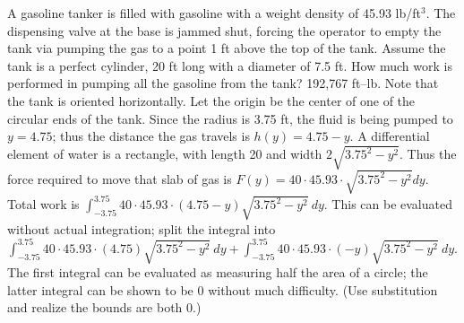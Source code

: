 {A gasoline tanker is filled with gasoline with a weight density of 45.93 lb/ft$^3$. The dispensing valve at the base is jammed shut, forcing the operator to empty the tank via pumping the gas to a point 1 ft above the top of the tank. Assume the tank is a perfect cylinder, 20 ft long with a diameter of 7.5 ft. 
How much work is performed in pumping all the gasoline from the tank?
}
{192,767 ft--lb. Note that the tank is oriented horizontally. Let the origin be the center of one of the circular ends of the tank. Since the radius is 3.75 ft, the fluid is being pumped to $y=4.75$; thus the distance the gas travels is $h(y)=4.75-y$. 
A differential element of water is a rectangle, with length 20 and width $2\sqrt{3.75^2-y^2}$. Thus the force required to move that slab of gas is $F(y) = 40\cdot45.93\cdot\sqrt{3.75^2-y^2}dy$. Total work is $\int_{-3.75}^{3.75} 40\cdot45.93\cdot(4.75-y)\sqrt{3.75^2-y^2}\ dy$. This can be evaluated without actual integration; split the integral into $\int_{-3.75}^{3.75} 40\cdot45.93\cdot(4.75)\sqrt{3.75^2-y^2}\ dy + \int_{-3.75}^{3.75} 40\cdot45.93\cdot(-y)\sqrt{3.75^2-y^2}\ dy$. The first integral can be evaluated as measuring half the area of a circle; the latter integral can be shown to be 0 without much difficulty. (Use substitution and realize the bounds are both 0.)
}
